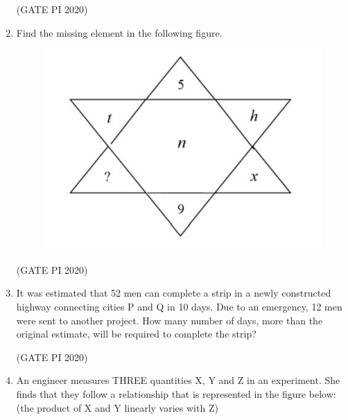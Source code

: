 \documentclass[journal,12pt,onecolumn]{IEEEtran}
\theoremstyle{remark}
\begin{document}
\begin{enumerate}
\hfill (GATE PI 2020)

\item Find the missing element in the following figure.

\begin{figure}[H]
    \centering
    \includegraphics[width=0.5\columnwidth]{figs/fig2.png}
    \caption{}
    \label{fig:placeholder}
\end{figure} 


\begin{enumerate}
\end{enumerate}

\hfill (GATE PI 2020)

\item It was estimated that 52 men can complete a strip in a newly constructed highway connecting cities P and Q in 10 days. Due to an emergency, 12 men were sent to another project. How many number of days, more than the original estimate, will be required to complete the strip?
\begin{enumerate}
\end{enumerate}

\hfill (GATE PI 2020)

\item An engineer measures THREE quantities X, Y and Z in an experiment. She finds that they follow a relationship that is represented in the figure below: (the product of X and Y linearly varies with Z)


\end{enumerate}
\end{document}
